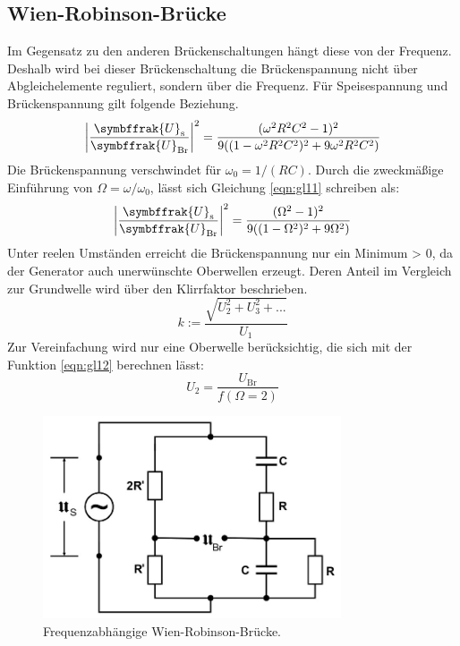 \subsection{Wien-Robinson-Brücke}
\label{sec:Theorie5}
Im Gegensatz zu den anderen Brückenschaltungen hängt diese von der Frequenz.
Deshalb wird bei dieser Brückenschaltung die Brückenspannung nicht über Abgleichelemente reguliert, sondern über die Frequenz.
Für Speisespannung und Brückenspannung gilt folgende Beziehung.
\begin{equation}
  \left\lvert \frac{\symbffrak{U}_{\text{s}}}{\symbffrak{U}_{\text{Br}}} \right\rvert^2 = \frac{(\omega^2 R^2 C^2 - 1)^2}{9((1 - \omega^2 R^2 C^2)^2 + 9 \omega^2 R^2 C^2)}
  \label{eqn:gl11}
\end{equation}
Die Brückenspannung verschwindet für $\omega_0 = 1/(RC)$.
Durch die zweckmäßige Einführung von $\Omega = \omega/\omega_0$, lässt sich Gleichung \eqref{eqn:gl11} schreiben als:
\begin{equation}
  \left\lvert \frac{\symbffrak{U}_{\text{s}}}{\symbffrak{U}_{\text{Br}}} \right\rvert^2 = \frac{(\Omega^2 - 1)^2}{9((1 - \Omega^2)^2 + 9 \Omega^2)}
  \label{eqn:gl12}
\end{equation}
Unter reelen Umständen erreicht die Brückenspannung nur ein Minimum > 0, da der Generator auch unerwünschte Oberwellen erzeugt.
Deren Anteil im Vergleich zur Grundwelle wird über den Klirrfaktor beschrieben.
\begin{equation}
  k := \frac{\sqrt{U^2_2 + U^2_3 + ...}}{U_1}
  \label{eqn:13}
\end{equation}
Zur Vereinfachung wird nur eine Oberwelle berücksichtig, die sich mit der Funktion \eqref{eqn:gl12} berechnen lässt:
\begin{equation}
  U_2 = \frac{U_{\text{Br}}}{f(\Omega =2)}
  \label{eqn:14}
\end{equation}
\begin{figure}
  \includegraphics[height=6cm]{data/Schaltung6.jpg}
  \centering
  \caption{Frequenzabhängige Wien-Robinson-Brücke.}
  \label{fig:Schaltung6}
\end{figure}
\FloatBarrier

